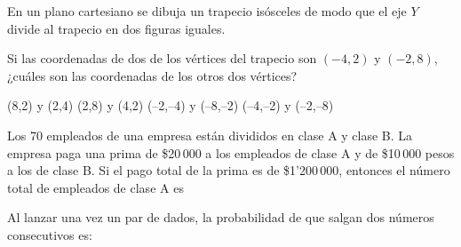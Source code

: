 \documentclass[10pt,addpoints]{exam}
\begin{document}
\begin{questions}
En un plano cartesiano se dibuja un trapecio isósceles de modo que el eje $Y$ divide al trapecio en dos figuras iguales.

Si las coordenadas de dos de los vértices del trapecio son $(-4,2)$ y $(-2,8)$, ¿cuáles son las coordenadas de los otros dos vértices?
\begin{multicols}{2}
 \begin{choices}
  \choice (8,2) y (2,4)
  \CorrectChoice (2,8) y (4,2)
  \choice (--2,--4) y (--8,--2)
  \choice (--4,--2) y (--2,--8)
 \end{choices}
\end{multicols}
\question Los 70 empleados de una empresa están divididos en clase A y clase B. La empresa paga una prima de \$20\,000 a los empleados de clase A y de \$10\,000 pesos a los de clase B. Si el pago total de la prima es de \$1'200\,000, entonces el número total de empleados de clase A es

\begin{oneparchoices}
\end{oneparchoices}
\question Al lanzar una vez un par de dados, la probabilidad de que salgan dos números consecutivos es:


\end{questions}
\end{document}
